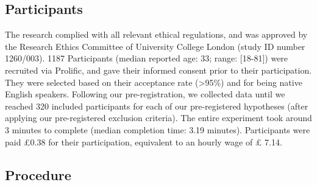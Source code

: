 \documentclass[12pt,twoside]{reedthesis}
\begin{document}
\hypertarget{participants}{%
\subsection{Participants}\label{participants}}

The research complied with all relevant ethical regulations, and was approved by the Research Ethics Committee of University College London (study ID number 1260/003). 1187 Participants (median reported age: 33; range: {[}18-81{]}) were recruited via Prolific, and gave their informed consent prior to their participation. They were selected based on their acceptance rate (\textgreater95\%) and for being native English speakers. Following our pre-registration, we collected data until we reached 320 included participants for each of our pre-registered hypotheses (after applying our pre-registered exclusion criteria). The entire experiment took around 3 minutes to complete (median completion time: 3.19 minutes). Participants were paid £0.38 for their participation, equivalent to an hourly wage of £ 7.14.

\hypertarget{procedure}{%
\subsection{Procedure}\label{procedure}}
\end{document}
